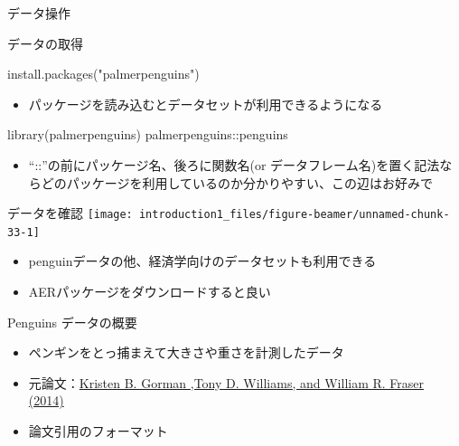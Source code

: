 \documentclass[
  ignorenonframetext,
]{beamer}
\newenvironment{Shaded}{\begin{snugshade}}{\end{snugshade}}
\newcommand{\FunctionTok}[1]{\textcolor[rgb]{0.00,0.00,0.00}{#1}}
\newcommand{\NormalTok}[1]{#1}
\newcommand{\SpecialCharTok}[1]{\textcolor[rgb]{0.00,0.00,0.00}{#1}}
\newcommand{\StringTok}[1]{\textcolor[rgb]{0.31,0.60,0.02}{#1}}
\providecommand{\tightlist}{%
  \setlength{\itemsep}{0pt}\setlength{\parskip}{0pt}}
\begin{document}
\begin{frame}[fragile]{データ操作}
\begin{block}{データの取得}
\begin{Shaded}
\begin{Highlighting}[]
\FunctionTok{install.packages}\NormalTok{(}\StringTok{"palmerpenguins"}\NormalTok{)}
\end{Highlighting}
\end{Shaded}

\begin{itemize}
\tightlist
\item
  パッケージを読み込むとデータセットが利用できるようになる
\end{itemize}

\begin{Shaded}
\begin{Highlighting}[]
\FunctionTok{library}\NormalTok{(palmerpenguins)}
\NormalTok{palmerpenguins}\SpecialCharTok{::}\NormalTok{penguins}
\end{Highlighting}
\end{Shaded}

\begin{itemize}
\tightlist
\item
  ``::''の前にパッケージ名、後ろに関数名(or
  データフレーム名)を置く記法ならどのパッケージを利用しているのか分かりやすい、この辺はお好みで
\end{itemize}
\end{block}

\begin{block}{データを確認}
\protect\hypertarget{ux30c7ux30fcux30bfux3092ux78baux8a8d}{}
\texttt{[image: introduction1\_files/figure-beamer/unnamed-chunk-33-1]}

\begin{itemize}
\tightlist
\item
  penguinデータの他、経済学向けのデータセットも利用できる
\item
  AERパッケージをダウンロードすると良い
\end{itemize}
\end{block}

\begin{block}{Penguins データの概要}
\protect\hypertarget{penguins-ux30c7ux30fcux30bfux306eux6982ux8981}{}
\begin{itemize}
\tightlist
\item
  ペンギンをとっ捕まえて大きさや重さを計測したデータ
\item
  元論文：\href{https://journals.plos.org/plosone/article?id=10.1371/journal.pone.0090081}{Kristen
  B. Gorman ,Tony D. Williams, and William R. Fraser (2014)}
\item
  論文引用のフォーマット


\end{itemize}
\end{block}
\end{frame}
\end{document}
